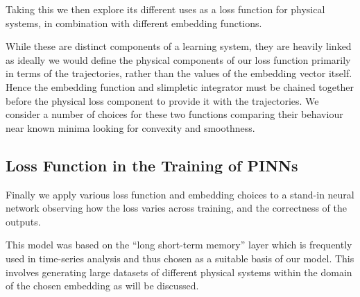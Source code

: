 Taking this \updimpl{} we then explore its different uses as a loss function for physical systems, in combination with different embedding functions.

While these are distinct components of a learning system, they are heavily linked as ideally we would define the physical components of our loss function primarily in terms of the trajectories, rather than the values of the embedding vector itself. Hence the embedding function and slimpletic integrator must be chained together before the physical loss component to provide it with the trajectories. We consider a number of choices for these two functions comparing their behaviour near known minima looking for convexity and smoothness.


\subsection{Loss Function in the Training of PINNs}

Finally we apply various loss function and embedding choices to a stand-in neural network observing how the loss varies across training, and the correctness of the outputs.

This model was based on the \enquote{long short-term memory} layer \cite{hochreiterLongShortTermMemory1997} which is frequently used in time-series analysis and thus chosen as a suitable basis of our model. This involves generating large datasets of different physical systems within the domain of the chosen embedding as will be discussed.
